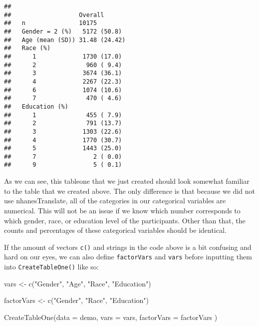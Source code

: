 \documentclass[
]{book}
\newenvironment{Shaded}{\begin{snugshade}}{\end{snugshade}}
\newcommand{\AttributeTok}[1]{\textcolor[rgb]{0.77,0.63,0.00}{#1}}
\newcommand{\FunctionTok}[1]{\textcolor[rgb]{0.00,0.00,0.00}{#1}}
\newcommand{\NormalTok}[1]{#1}
\newcommand{\OtherTok}[1]{\textcolor[rgb]{0.56,0.35,0.01}{#1}}
\newcommand{\StringTok}[1]{\textcolor[rgb]{0.31,0.60,0.02}{#1}}
\begin{document}
\begin{verbatim}
##                  
##                   Overall      
##   n               10175        
##   Gender = 2 (%)   5172 (50.8) 
##   Age (mean (SD)) 31.48 (24.42)
##   Race (%)                     
##      1             1730 (17.0) 
##      2              960 ( 9.4) 
##      3             3674 (36.1) 
##      4             2267 (22.3) 
##      6             1074 (10.6) 
##      7              470 ( 4.6) 
##   Education (%)                
##      1              455 ( 7.9) 
##      2              791 (13.7) 
##      3             1303 (22.6) 
##      4             1770 (30.7) 
##      5             1443 (25.0) 
##      7                2 ( 0.0) 
##      9                5 ( 0.1)
\end{verbatim}

As we can see, this tableone that we just created should look somewhat familiar to the table that we created above. The only difference is that because we did not use nhanesTranslate, all of the categories in our categorical variables are numerical. This will not be an issue if we know which number corresponds to which gender, race, or education level of the participants. Other than that, the counts and percentages of these categorical variables should be identical.

If the amount of vectors \texttt{c()} and strings in the code above is a bit confusing and hard on our eyes, we can also define \texttt{factorVars} and \texttt{vars} before inputting them into \texttt{CreateTableOne()} like so:

\begin{Shaded}
\begin{Highlighting}[]
\NormalTok{vars }\OtherTok{\textless{}{-}} \FunctionTok{c}\NormalTok{(}\StringTok{"Gender"}\NormalTok{, }\StringTok{"Age"}\NormalTok{, }\StringTok{"Race"}\NormalTok{, }\StringTok{"Education"}\NormalTok{)}
\end{Highlighting}
\end{Shaded}

\begin{Shaded}
\begin{Highlighting}[]
\NormalTok{factorVars }\OtherTok{\textless{}{-}} \FunctionTok{c}\NormalTok{(}\StringTok{"Gender"}\NormalTok{, }\StringTok{"Race"}\NormalTok{, }\StringTok{"Education"}\NormalTok{)}
\end{Highlighting}
\end{Shaded}

\begin{Shaded}
\begin{Highlighting}[]
\FunctionTok{CreateTableOne}\NormalTok{(}\AttributeTok{data =}\NormalTok{ demo,}
               \AttributeTok{vars =}\NormalTok{ vars,}
               \AttributeTok{factorVars =}\NormalTok{ factorVars}
\NormalTok{              )}
\end{Highlighting}
\end{Shaded}
\end{document}
